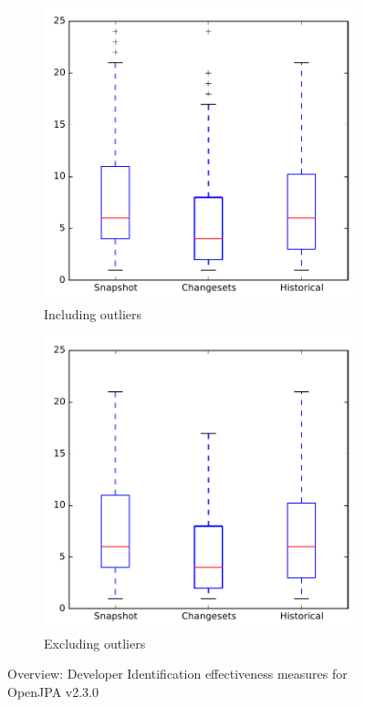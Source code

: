 
\begin{figure}
    \centering
    \begin{subfigure}{.4\textwidth}
        \centering
        \includegraphics[height=0.4\textheight]{figures/dit/all_openjpa}
        \caption{Including outliers}\label{fig:dit:all:openjpa_outlier}
    \end{subfigure}%
    \begin{subfigure}{.4\textwidth}
        \centering
        \includegraphics[height=0.4\textheight]{figures/dit/all_openjpa_no_outlier}
        \caption{Excluding outliers}\label{fig:dit:all:openjpa_no_outlier}
    \end{subfigure}
\caption{Overview: Developer Identification effectiveness measures for OpenJPA v2.3.0}
\label{fig:dit:all:openjpa}
\end{figure}
